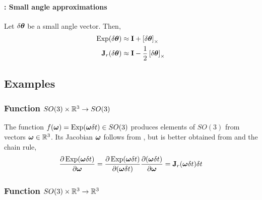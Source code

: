 \paragraph{\csmall : Small angle approximations}

Let $\dth$ be a small angle vector. Then,
%
\begin{align}
\Exp(\dth) &\approx \bfI + \hatx{\dth} \\
\bfJ_r(\dth) &\approx \bfI - \frac12\hatx{\dth} 
\end{align}






\subsection{Examples}

\subsubsection{Function $SO(3)\times\bbR^3\to SO(3)$} 
\label{sec:jac_R3toSO3}

The function $f(\bw) = \Exp(\bw\dt)\in SO(3)$ produces elements of $SO(3)$ from vectors $\bw\in\bbR^3$. 
Its Jacobian \wrt $\bw$ follows from , but is better obtained from  and the chain rule,
%
\begin{align*}
\dpar{\Exp(\bw\dt)}{\bw}
= \dpar{\Exp(\bw\dt)}{(\bw\dt)}\dpar{(\bw\dt)}{\bw} 
= \bfJ_r(\bw\dt)\dt
\end{align*}
%


\subsubsection{Function $SO(3)\times\bbR^3\to\bbR^3$} 
\label{sec:jac_SO3xR3toR3}

